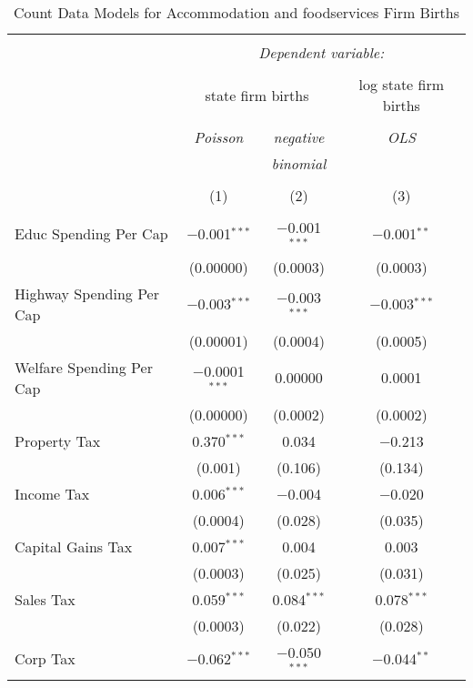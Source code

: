 
\begin{table}[!htbp] \centering 
  \caption{Count Data Models for Accommodation and foodservices Firm Births} 
  \label{} 
\begin{tabular}{@{\extracolsep{5pt}}lccc} 
\\[-1.8ex]\hline 
\hline \\[-1.8ex] 
 & \multicolumn{3}{c}{\textit{Dependent variable:}} \\ 
\cline{2-4} 
\\[-1.8ex] & \multicolumn{2}{c}{state firm births} & log state firm births \\ 
\\[-1.8ex] & \textit{Poisson} & \textit{negative} & \textit{OLS} \\ 
 & \textit{} & \textit{binomial} & \textit{} \\ 
\\[-1.8ex] & (1) & (2) & (3)\\ 
\hline \\[-1.8ex] 
 Educ Spending Per Cap & $-$0.001$^{***}$ & $-$0.001$^{***}$ & $-$0.001$^{**}$ \\ 
  & (0.00000) & (0.0003) & (0.0003) \\ 
  Highway Spending Per Cap  & $-$0.003$^{***}$ & $-$0.003$^{***}$ & $-$0.003$^{***}$ \\ 
  & (0.00001) & (0.0004) & (0.0005) \\ 
  Welfare Spending Per Cap  & $-$0.0001$^{***}$ & 0.00000 & 0.0001 \\ 
  & (0.00000) & (0.0002) & (0.0002) \\ 
  Property Tax & 0.370$^{***}$ & 0.034 & $-$0.213 \\ 
  & (0.001) & (0.106) & (0.134) \\ 
  Income Tax & 0.006$^{***}$ & $-$0.004 & $-$0.020 \\ 
  & (0.0004) & (0.028) & (0.035) \\ 
  Capital Gains Tax & 0.007$^{***}$ & 0.004 & 0.003 \\ 
  & (0.0003) & (0.025) & (0.031) \\ 
  Sales Tax & 0.059$^{***}$ & 0.084$^{***}$ & 0.078$^{***}$ \\ 
  & (0.0003) & (0.022) & (0.028) \\ 
  Corp Tax & $-$0.062$^{***}$ & $-$0.050$^{***}$ & $-$0.044$^{**}$ \\ 

\end{tabular}
\end{table}
